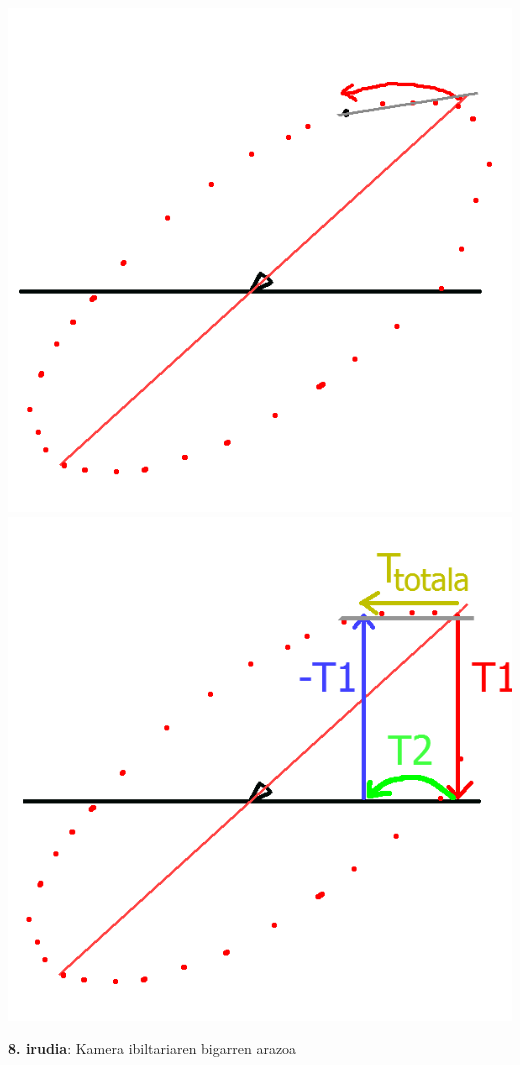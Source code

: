 \documentclass[12pt]{article}
\begin{document}
\begin{center}
\includegraphics[scale=0.3]{kam_ibil_b1.png}
\includegraphics[scale=0.3]{kam_ibil_b1_sol.png}

\textbf{8. irudia}: Kamera ibiltariaren bigarren arazoa
\end{center}
\end{document}
